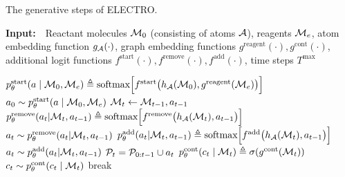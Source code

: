 \begin{algorithm}[t]
  \caption{The generative steps of ELECTRO.}
  {\bf Input:}~~Reactant molecules ${\mathcal{M}}_0$ (consisting of atoms ${\mathcal{A}}$), reagents ${\mathcal{M}}_e$, atom embedding function $g_{{\mathcal{A}}}(\cdot)$, graph embedding functions $g^\mathrm{reagent}(\cdot),g^\mathrm{cont}(\cdot)$, additional logit functions $f^\mathrm{start}(\cdot),f^\mathrm{remove}(\cdot),f^\mathrm{add}(\cdot)$, time steps $T^\mathrm{max}$
  
  \begin{algorithmic}[1]
  	\STATE $p_\theta^{\mathrm{start}}(a \mid {\mathcal{M}}_0, {\mathcal{M}}_e) \triangleq \mbox{softmax}\Big[f^{\mathrm{start}}\big(h_{{\mathcal{A}}}({\mathcal{M}}_0), g^\mathrm{reagent}({\mathcal{M}}_e)\big)\Big]$ 
  	\STATE $a_{0} \sim p_\theta^{\mathrm{start}}(a \mid {\mathcal{M}}_0, {\mathcal{M}}_e)$
  		\STATE ${\mathcal{M}}_t \leftarrow {\mathcal{M}}_{t-1}, a_{t-1}$ 
  			\STATE $p_\theta^{\mathrm{remove}}(a_t | {\mathcal{M}}_t, a_{t-1}) \triangleq \mbox{softmax}\Big[f^{\mathrm{remove}}\big(h_{{\mathcal{A}}}({\mathcal{M}}_t), a_{t-1}\big)\Big]$ 
  			\STATE $a_t \sim p_\theta^{\mathrm{remove}}(a_t | {\mathcal{M}}_t, a_{t-1})$ 
  		\ELSE
  		  	\STATE $p_\theta^{\mathrm{add}}(a_t | {\mathcal{M}}_t, a_{t-1}) \triangleq \mbox{softmax}\Big[f^{\mathrm{add}}\big(h_{{\mathcal{A}}}({\mathcal{M}}_t), a_{t-1}\big)\Big]$
  			\STATE  $a_t \sim p_\theta^{\mathrm{add}}(a_t | {\mathcal{M}}_t, a_{t-1})$ 
  		\ENDIF
  		\STATE ${\mathcal{P}}_t = {\mathcal{P}}_{0:t-1} \cup a_t$
  		\STATE $p_\theta^{\textrm{cont}}(c_t \mid {\mathcal{M}}_t) \triangleq \sigma(g^{\textrm{cont}}({\mathcal{M}}_t))$
  		\STATE $c_t \sim p_\theta^{\textrm{cont}}(c_t \mid {\mathcal{M}}_t)$ 
  			\STATE break
  		\ENDIF
  	\ENDFOR
  	

\end{algorithmic}
\end{algorithm}
